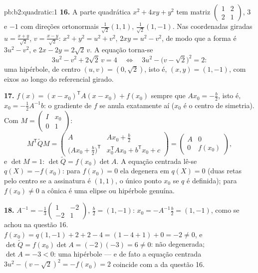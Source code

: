 \begin{solution}{pb:b2:quadratic:1}
\textbf{16.} A parte quadrática $x^2 + 4xy + y^2$ tem matriz
$\begin{pmatrix}1 & 2\\ 2 & 1\end{pmatrix}$,  $3$
e $-1$ com direções ortonormais $\frac{1}{\sqrt2}(1,1)$,
$\frac{1}{\sqrt2}(1,-1)$. Nas coordenadas giradas $u =
\frac{x+y}{\sqrt2}$, $v = \frac{x-y}{\sqrt2}$: $x^2 + y^2 = u^2
+ v^2$, $2xy = u^2 - v^2$, de modo que a forma é $3u^2 - v^2$, e $2x
- 2y = 2\sqrt2\,v$. A equação torna-se
\[
3u^2 - v^2 + 2\sqrt2\,v = 4
\quad\Longleftrightarrow\quad
3u^2 - \bigl(v - \sqrt2\bigr)^2 = 2 :
\]
uma hipérbole, de centro $(u, v) = (0, \sqrt2)$, isto é, $(x, y) =
(1, -1)$, com eixos ao longo do referencial girado.

\textbf{17.} $f(x) = (x - x_0)^{\mathsf T}A(x - x_0) + f(x_0)$
sempre que $Ax_0 = -\frac b2$, isto é, $x_0 = -\frac12A^{-1}b$: o
gradiente de $f$ se anula exatamente aí ($x_0$ é o centro de
simetria). Com $M = \begin{pmatrix} I & x_0\\ 0 &
1\end{pmatrix}$:
\[
M^{\mathsf T}\widetilde QM
= \begin{pmatrix}
A & Ax_0 + \frac b2\\[2pt]
\bigl(Ax_0 + \frac b2\bigr)^{\mathsf T} &
x_0^{\mathsf T}Ax_0 + b^{\mathsf T}x_0 + c
\end{pmatrix}
= \begin{pmatrix} A & 0\\ 0 & f(x_0)\end{pmatrix},
\]
e $\det M = 1$: $\det\widetilde Q = f(x_0)\det A$. A
equação centrada lê-se $q(X) = -f(x_0)$: para $f(x_0) = 0$ ela
degenera em $q(X) = 0$ (duas retas pelo centro se a
assinatura é $(1,1)$, o único ponto $x_0$ se $q$ é
definida); para $f(x_0) \neq 0$ a cônica é uma elipse ou
hipérbole genuína.

\textbf{18.} $A^{-1} = -\frac13\begin{pmatrix} 1 & -2\\ -2 &
1\end{pmatrix}$, $\frac b2 = (1, -1)$: $x_0 =
-A^{-1}\frac b2 = (1, -1)$, como se achou na questão 16. $f(x_0) =
q(1,-1) + 2 + 2 - 4 = (1 - 4 + 1) + 0 = -2 \neq 0$, e
$\det\widetilde Q = f(x_0)\det A = (-2)(-3) = 6 \neq 0$:
não degenerada; $\det A = -3 < 0$: uma hipérbole --- e de fato
a equação centrada $3u^2 - (v - \sqrt2)^2 = -f(x_0) = 2$
coincide com a da questão 16.


\end{solution}
